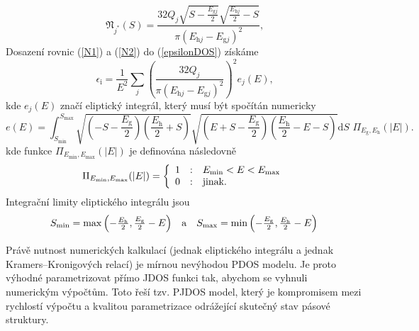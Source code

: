 \begin{equation}
\label{N2}
\mathfrak{N}_{j^*}(S) = 
\frac{
		32Q_j 
		\sqrt{S-\frac{E_{\mathrm{g}j}}{2}}
		\sqrt{\frac{E_{\mathrm{h}j}}{2}-S}
	}{
		\pi (E_{\mathrm{h}j} - E_{\mathrm{g}j})^2
	}
\text{,}
\end{equation}
Dosazení rovnic (\ref{N1}) a (\ref{N2}) do (\ref{epsilonDOS}) získáme
\begin{equation}
\epsilon_\mathrm{i} = \frac{1}{E^2} \sum_j \left(\frac{32Q_j}{\pi (E_{\mathrm{h}j} - E_{\mathrm{g}j})^2}\right)^2 e_j(E) \text{,}
\end{equation}
kde $e_j(E)$ značí eliptický integrál, který musí být spočítán numericky
\begin{equation}
e(E) = \int_{S_\mathrm{min}}^{S_\mathrm{max}}
\sqrt{\left(-S - \frac{E_\mathrm{g}}{2}\right)\left(\frac{E_\mathrm{h}}{2} + S\right)}
\sqrt{\left(E + S - \frac{E_\mathrm{g}}{2}\right)\left(\frac{E_\mathrm{h}}{2} -E - S\right)}
\mathrm{d}S\,\,\Pi_{E_{\mathrm{g}},E_{\mathrm{h}}}(|E|)\text{.}
\end{equation}
kde funkce $\Pi_{E_\mathrm{min},E_\mathrm{max}}(|E|)$ je definována následovně
\begin{equation}
\Pi_{E_\mathrm{min},E_\mathrm{max}}(|E|) = 
	\left\{\begin{array}{l c l} 
	1 & : & E_\mathrm{min} < E < E_\mathrm{max} \\
	0 & : & \text{jinak.} \end{array} \right.
\end{equation}
Integrační limity eliptického integrálu jsou 
\begin{equation}
\begin{array}{l c r}
S_\mathrm{min} = \max\left(-\frac{E_\mathrm{h}}{2}, \frac{E_\mathrm{g}}{2} -E\right) &
\text{a} &
S_\mathrm{max} = \min\left(-\frac{E_\mathrm{g}}{2}, \frac{E_\mathrm{h}}{2} -E\right) \\
\end{array}
\end{equation}



Právě nutnost numerických kalkulací (jednak eliptického integrálu a jednak Kramers--Kronigových relací) je mírnou nevýhodou PDOS modelu. Je proto výhodné parametrizovat přímo JDOS funkci tak, abychom se vyhnuli numerickým výpočtům. Toto řeší tzv. PJDOS model, který je kompromisem mezi rychlostí výpočtu a kvalitou parametrizace odrážející skutečný stav pásové struktury. 

